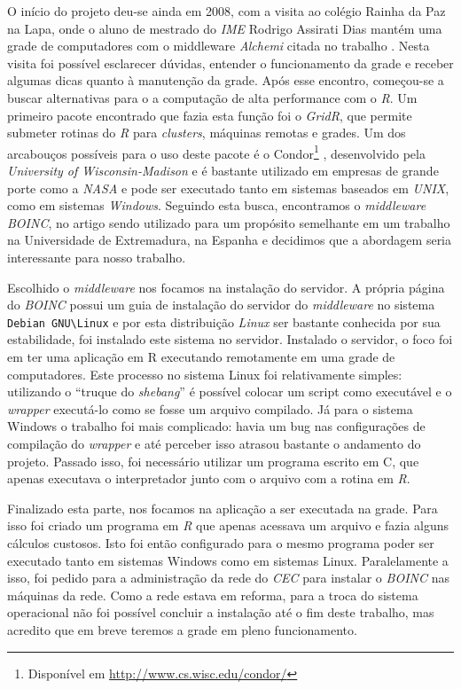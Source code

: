 
O início do projeto deu-se ainda em 2008, com a visita ao colégio Rainha da Paz na Lapa, onde o aluno de mestrado do \textit{IME}
Rodrigo Assirati Dias mantém uma grade de computadores com o middleware \textit{Alchemi} citada no trabalho \cite{Dias}.
Nesta visita foi possível esclarecer dúvidas, entender o funcionamento da grade e receber algumas dicas quanto à manutenção da grade. 
Após esse encontro, começou-se a buscar alternativas para o a computação de alta performance com o \textit{R}. Um primeiro pacote encontrado
que fazia esta função foi o \textit{GridR}, que permite submeter rotinas do \textit{R} para \textit{clusters}, máquinas remotas e 
grades. Um dos arcabouços possíveis para o uso deste pacote é o Condor\footnote{Disponível em \url{http://www.cs.wisc.edu/condor/}}
, desenvolvido pela \textit{University of Wisconsin-Madison} e é bastante utilizado em empresas
de grande porte como a \textit{NASA} e pode ser executado tanto em sistemas
baseados em \textit{UNIX}, como em sistemas \textit{Windows}. Seguindo esta busca, encontramos o 
\textit{middleware} \textit{BOINC}, no artigo \cite{boinc}
sendo utilizado para um propósito semelhante em um trabalho na Universidade de Extremadura, na Espanha 
e decidimos que a abordagem seria interessante para nosso trabalho.

Escolhido o \textit{middleware} nos focamos na instalação do servidor. A própria página do \textit{BOINC} 
possui um guia de instalação do servidor do \textit{middleware} no sistema \verb#Debian GNU\Linux# e por
esta distribuição \textit{Linux} ser bastante conhecida por sua estabilidade, foi instalado este sistema no servidor.
Instalado o servidor, o foco foi em ter uma aplicação em R executando remotamente em uma grade de computadores. 
Este processo no sistema Linux foi relativamente simples: utilizando o ``truque do \textit{shebang}'' é possível 
colocar um script como executável e o \textit{wrapper} executá-lo como se fosse um arquivo compilado. Já para
o sistema Windows %
o trabalho foi mais complicado: havia um bug nas configurações de compilação do \textit{wrapper} e até perceber isso
atrasou bastante o andamento do projeto. Passado isso, foi necessário utilizar um programa escrito em C, que apenas executava 
o interpretador junto com o arquivo com a rotina em \textit{R}.

Finalizado esta parte, nos focamos na aplicação a ser executada na grade. Para isso foi criado um programa em \textit{R} que
apenas acessava um arquivo e fazia alguns cálculos custosos. Isto foi então configurado para o mesmo programa poder
ser executado tanto em sistemas Windows como em sistemas Linux. Paralelamente a isso, foi pedido para a administração
da rede do \textit{CEC} para instalar o \textit{BOINC} nas máquinas da rede. Como a rede estava em reforma, para a troca
do sistema operacional não foi possível concluir a instalação até o fim deste trabalho, mas acredito que em breve teremos a grade em 
pleno funcionamento.


